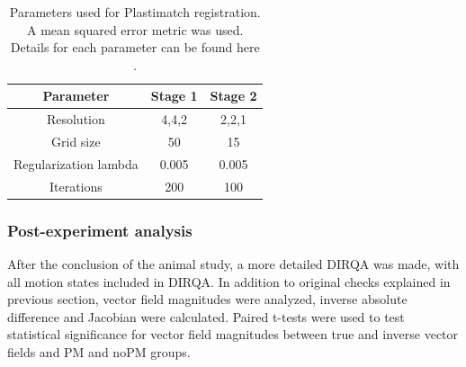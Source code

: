 \documentclass[type=dr, dr=rernat, accentcolor=tud7b,colorbacktitle, bigchapter, openright, twoside, 12pt ]{tudthesis}
\begin{document}
\begin{table}[H]
  \centering
  \caption{Parameters used for Plastimatch registration.  A mean squared error metric was used. Details for each parameter can be found here \cite{Plastimatch}.}
  \begin{tabular}{c|c|c}
      Parameter & Stage 1 & Stage 2 \\
      \hline
      Resolution & 4,4,2 & 2,2,1 \\
      Grid size & 50 & 15 \\
      Regularization lambda & 0.005 & 0.005 \\
      Iterations & 200 & 100 \\
    \hline\hline
  \end{tabular}
  \label{tab:stages2}
\end{table}

\subsubsection{Post-experiment analysis}

After the conclusion of the animal study, a more detailed DIRQA was made, with all motion states included in DIRQA. In addition to original checks explained in previous section, vector field magnitudes were analyzed, inverse absolute difference
and Jacobian were calculated. Paired t-tests were used to test statistical significance for vector field magnitudes between true and inverse vector fields and PM and noPM groups.
\end{document}
